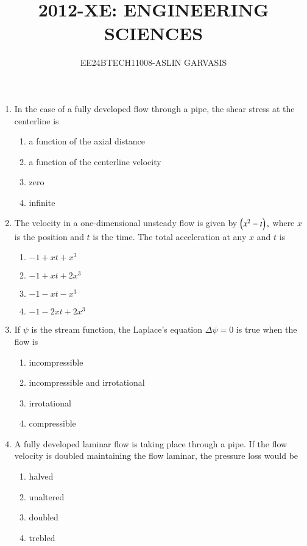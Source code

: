 \documentclass[journal,15pt,onecolumn]{IEEEtran}
\theoremstyle{remark}
\begin{document}

\vspace{3cm}
\title{2012-XE: ENGINEERING SCIENCES}
\author{EE24BTECH11008-ASLIN GARVASIS}
\maketitle
\begin{enumerate}[start=6]
    \item In the case of a fully developed flow through a pipe, the shear stress at the centerline is
    \begin{enumerate}
        \item a function of the axial distance
        \item a function of the centerline velocity
        \item zero
        \item infinite
    \end{enumerate}
    \item The velocity in a one-dimensional unsteady flow is given by $\left(x^2-t\right),$ where $x$ is the position and $t$ is the time. The total acceleration at any $x$ and $t$ is
    \begin{enumerate}
        \item $-1+xt+x^3$
        \item $-1+xt+2x^3$
        \item $-1-xt-x^3$
        \item $-1-2xt+2x^3$
    \end{enumerate}
    \item If $\psi$ is the stream function, the Laplace's equation $\Delta \psi=0$ is true when the flow is
    \begin{enumerate}
        \item incompressible
        \item incompressible and irrotational
        \item irrotational
        \item compressible
    \end{enumerate}
    \item A fully developed laminar flow is taking place through a pipe. If the flow velocity is doubled maintaining the flow laminar, the pressure loss would be
    \begin{enumerate}
        \item halved
        \item unaltered
        \item doubled
        \item trebled

\end{enumerate}
\end{enumerate}
\end{document}

